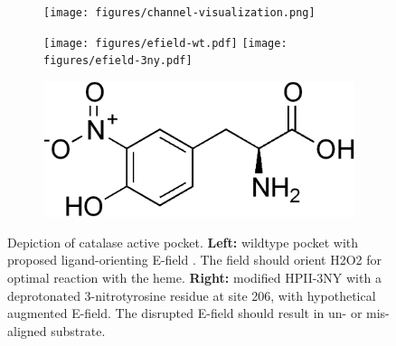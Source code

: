 \documentclass[journal=jacsat,manuscript=article]{achemso}
\begin{document}
\begin{figure}
  \begin{subfigure}{0.4\textwidth}
    \begin{minipage}{0.1\textwidth}\caption{}\end{minipage}%
    \begin{minipage}{.9\textwidth}
      \texttt{[image: figures/channel-visualization.png]}
    \end{minipage}
  \end{subfigure}%
  \begin{subfigure}{0.6\textwidth}
    \begin{minipage}{0.1\textwidth}\caption{}\end{minipage}%
    \begin{minipage}{.9\textwidth}
      \texttt{[image: figures/efield-wt.pdf]}%
      \hspace{1cm}
      \texttt{[image: figures/efield-3ny.pdf]}%
    \end{minipage}
  \end{subfigure}
  \vspace{3cm}
  \begin{subfigure}{0.5\textwidth}
    \begin{minipage}{0.1\textwidth}\caption{}\end{minipage}%
    \begin{minipage}{.9\textwidth}
      \includegraphics[width=\linewidth]{figures/3ny.png}%
      \end{minipage}
  \end{subfigure}
  \caption{Depiction of catalase active pocket. \textbf{Left:} wildtype pocket with proposed ligand-orienting E-field \cite{electricpotential}. The field should orient H2O2 for optimal reaction with the heme. \textbf{Right:} modified HPII-3NY with a deprotonated 3-nitrotyrosine residue at site 206, with hypothetical augmented E-field. The disrupted E-field should result in un- or mis-aligned substrate.}
  \label{fig:hypothesis}
\end{figure}
\end{document}
